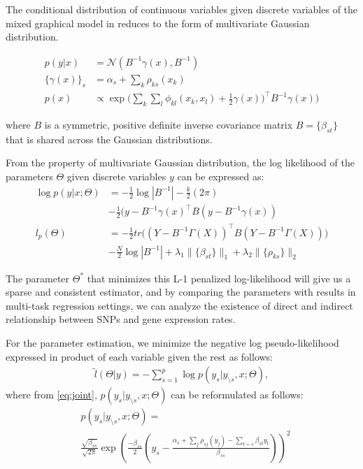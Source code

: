 \documentclass{article}
\begin{document}
The conditional distribution of continuous variables given discrete variables of the mixed graphical model in \cite{lee2013structure} reduces to the form of multivariate Gaussian distribution.

\begin{align}
p(y|x) &= \mathcal{N}(B^{-1}\gamma(x), B^{-1}) \label{eq:cond_prob}\\
\{\gamma(x)\}_s &= \alpha_s + \sum_{k} \rho_{ks}(x_k) \\
p(x) &\propto \exp \Big( \sum_{k} \sum_{l} \phi_{kl}(x_k, x_l) + \frac{1}{2} \gamma(x))^\intercal B^{-1} \gamma(x) \Big)
\end{align}

where $B$ is a symmetric, positive definite inverse covariance matrix $B = \{ \beta_{st}\}$ that is shared across the Gaussian distributions. 

From the property of multivariate Gaussian distribution, the log likelihood of the parameters $\Theta$ given discrete variables $y$ can be expressed as:
\begin{align}
\log p(y | x; \Theta) &= -\frac{1}{2}\log |B^{-1}| -\frac{k}{2} (2 \pi) \nonumber    \\
& -\frac{1}{2} (y - B^{-1} \gamma(x)^\intercal B (y - B^{-1} \gamma(x)) \label{eq:loglikli} \\ 
l_p(\Theta) &= -\frac{1}{2} tr\Big((Y - B^{-1} \Gamma(X))^\intercal B (Y - B^{-1} \Gamma(X)) \Big) \nonumber \\
& -\frac{N}{2} \log|B^{-1}| + \lambda_1 \|\{\beta_{st}\}\|_1 + \lambda_2 \|\{\rho_{ks}\}\|_2 \label{eq:obj}
\end{align}

The parameter $\Theta^*$ that minimizes this L-1 penalized log-likelihood will give us a sparse and consistent estimator, and by comparing the parameters with results in multi-task regression settings, we can analyze the existence of direct and indirect relationship between SNPs and gene expression rates.

For the parameter estimation, we minimize the negative log pseudo-likelihood expressed in product of each variable given the rest as follows:
\begin{align}
\tilde{l}(\Theta |y) = - \sum_{s=1}^{p} \log p(y_s |y_{\setminus s}, x;\Theta),
\end{align}
where from \ref{eq:joint}, $p(y_s |y_{\setminus s}, x;\Theta)$ can be reformulated as follows:
\begin{align}
&p(y_s |y_{\setminus s}, x;\Theta) =\nonumber    \\
& \frac{\sqrt{\beta_{ss}}}{\sqrt{2\pi}} \exp \left(\frac{-\beta_{ss}}{2} \left(y_s - \frac{\alpha_s + \sum_j \rho_{sj}(y_j)-\sum_{t=s}\beta_{st}y_t }{\beta_{ss}}\right) \right)^2
\end{align}
\end{document}
